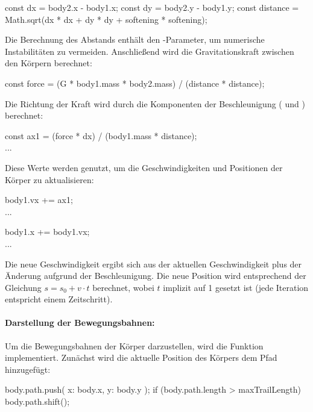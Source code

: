 \documentclass[a4paper,12pt,twoside]{article}
\begin{document}
\begin{javascript}
const dx = body2.x - body1.x;
const dy = body2.y - body1.y;
const distance = Math.sqrt(dx * dx + dy * dy + softening * softening);
\end{javascript}

Die Berechnung des Abstands  enthält den -Parameter, um numerische Instabilitäten zu vermeiden. Anschließend wird die Gravitationskraft zwischen den Körpern berechnet:

\begin{javascript}
const force = (G * body1.mass * body2.mass) / (distance * distance);
\end{javascript}

Die Richtung der Kraft wird durch die Komponenten der Beschleunigung ( und ) berechnet:

\begin{javascript}
const ax1 = (force * dx) / (body1.mass * distance);
\\...
\end{javascript}

Diese Werte werden genutzt, um die Geschwindigkeiten und Positionen der Körper zu aktualisieren:

\begin{javascript}
body1.vx += ax1;
\\...

body1.x += body1.vx;
\\...
\end{javascript}

Die neue Geschwindigkeit ergibt sich aus der aktuellen Geschwindigkeit plus der Änderung aufgrund der Beschleunigung. Die neue Position wird entsprechend der Gleichung \( s = s_0 + v \cdot t \) berechnet, wobei \( t \) implizit auf 1 gesetzt ist (jede Iteration entspricht einem Zeitschritt).

\paragraph{Darstellung der Bewegungsbahnen:}
Um die Bewegungsbahnen der Körper darzustellen, wird die Funktion  implementiert. Zunächst wird die aktuelle Position des Körpers dem Pfad hinzugefügt:

\begin{javascript}
body.path.push({ x: body.x, y: body.y });
if (body.path.length > maxTrailLength) body.path.shift();
\end{javascript}
\end{document}

